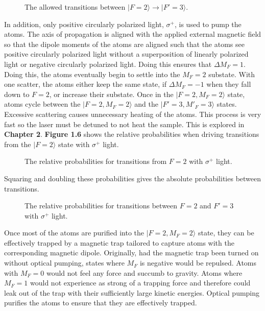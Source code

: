 \begin{figure}[h!]
\begin{center}
\end{center}
\caption{The allowed transitions between $| F=2\rangle \rightarrow |F'=3\rangle$. \cite{foot} }
\end{figure}

In addition, only positive circularly polarized light, $\sigma^+$, is used to pump the atoms. The axis of propagation is aligned with the applied external magnetic field so that the dipole moments of the atoms are aligned such that the atoms see positive circularly polarized light without a superposition of linearly polarized light or negative circularly polarized light. Doing this ensures that $\Delta M_F = 1$. Doing this, the atoms eventually begin to settle into the $M_F=2$ substate. With one scatter, the atoms either keep the same state, if $\Delta M_F = -1$ when they fall down to $F=2$, or increase their substate. Once in the $| F=2, M_F = 2\rangle$ state, atoms cycle between the $| F=2, M_F = 2\rangle$ and the $| F'=3, M'_F = 3\rangle$ states. Excessive scattering causes unnecessary heating of the atoms. This process is very fast so the laser must be detuned to not heat the sample. This is explored in \textbf{Chapter 2}. \textbf{Figure 1.6} shows the relative probabilities when driving transitions from the $| F=2\rangle$ state with $\sigma^+$ light.

\begin{figure}[h!]
\begin{center}
\end{center}
\caption{The relative probabilities for transitions from $F=2$ with $\sigma^+$ light. \cite{steck} }
\end{figure}

Squaring and doubling these probabilities gives the absolute probabilities between transitions. 
\begin{figure}[h!]
\begin{center}
\end{center}
\caption{The relative probabilities for transitions between $F=2$ and $F'=3$ with $\sigma^+$ light. \cite{Atoneche} }
\end{figure}

Once most of the atoms are purified into the $| F=2, M_F = 2\rangle$ state, they can be effectively trapped by a magnetic trap tailored to capture atoms with the corresponding magnetic dipole. Originally, had the magnetic trap been turned on without optical pumping, states where $M_F$ is negative would be repulsed. Atoms with $M_F=0$ would not feel any force and succumb to gravity. Atoms where $M_F=1$ would not experience as strong of a trapping force and therefore could leak out of the trap with their sufficiently large kinetic energies. Optical pumping purifies the atoms to ensure that they are effectively trapped. 

